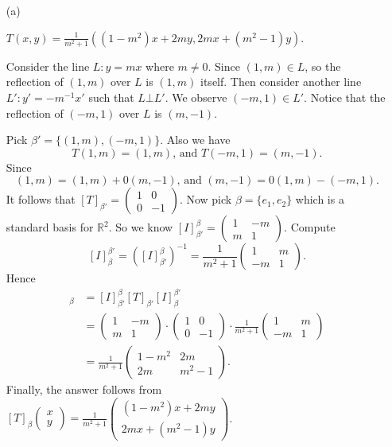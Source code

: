 \begin{Exercise}
	\begin{enumerate}[(a)]
		\item[(a)]
		\begin{answer}
			$T(x,y) = \frac{1}{m^2+1}\left((1-m^2)x+2m y,2m x+(m^2-1)y\right)$.
		\end{answer}
		\begin{solution}
			Consider the line $L:y=m x$ where $m\neq 0$. Since $(1,m)\in L$, so the reflection of $(1,m)$ over $L$ is $(1,m)$ itself. Then consider another line $L':y'=-m^{-1} x'$ such that $L\bot L'$. We observe $(-m,1)\in L'$. Notice that the reflection of $(-m,1)$ over $L$ is $(m,-1)$.
			
			Pick $\beta' = \{(1,m),(-m,1)\}$. Also we have
			$$
			T(1,m) = (1,m)\text{, and } T(-m,1) = (m,-1).
			$$
			Since 
			$$
			(1,m) = (1,m)+0(m,-1) \text{, and } (m,-1) = 0(1,m)-(-m,1).
			$$
			It follows that $[T]_{\beta'} = \begin{pmatrix}
			1 & 0 \\
			0 & -1
			\end{pmatrix}$. Now pick $\beta = \{e_1,e_2\}$ which is a standard basis for $\mathbb{R}^2$. So we know $[I]_{\beta'}^{\beta} = \begin{pmatrix}
			1 & -m \\
			m & 1
			\end{pmatrix}$. Compute 
			$$
			[I]_{\beta}^{\beta'} = ([I]_{\beta'}^{\beta})^{-1} = \frac{1}{m^2+1}\begin{pmatrix}
			1 & m \\
			-m & 1
			\end{pmatrix}.
			$$
			Hence
			\begin{align*}
			[T]_{\beta} 
			&= [I]_{\beta'}^{\beta} [T]_{\beta'} [I]_{\beta}^{\beta'} \\
			&= \begin{pmatrix}
			1 & -m \\
			m & 1
			\end{pmatrix} \cdot \begin{pmatrix}
			1 & 0 \\
			0 & -1
			\end{pmatrix} \cdot \frac{1}{m^2+1}\begin{pmatrix}
			1 & m \\
			-m & 1
			\end{pmatrix} \\
			&= \frac{1}{m^2+1}\begin{pmatrix}
			1-m^2 & 2m \\
			2m & m^2-1
			\end{pmatrix}.
			\end{align*}
			Finally, the answer follows from $[T]_{\beta}\begin{pmatrix}
			x \\
			y
			\end{pmatrix} = \frac{1}{m^2+1}\begin{pmatrix}
			(1-m^2)x+2m y \\
			2m x + (m^2-1) y
			\end{pmatrix}$.
		\end{solution}
		

\end{enumerate}
\end{Exercise}
